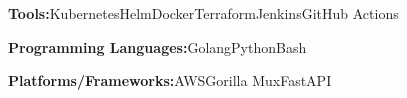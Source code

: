 
\begin{cvlist}
  {
    \begin{cvitems}
    \item {\textbf{Tools:}{\enskip}Kubernetes{\enskip\cdotp\enskip}Helm{\enskip\cdotp\enskip}Docker{\enskip\cdotp\enskip}Terraform{\enskip\cdotp\enskip}Jenkins{\enskip\cdotp\enskip}GitHub Actions}
      \item {\textbf{Programming Languages:}{\enskip}Golang{\enskip\cdotp\enskip}Python{\enskip\cdotp\enskip}Bash}
      \item {\textbf{Platforms/Frameworks:}{\enskip}AWS{\enskip\cdotp\enskip}Gorilla Mux{\enskip\cdotp\enskip}FastAPI}
    \end{cvitems}
  }
\end{cvlist}


